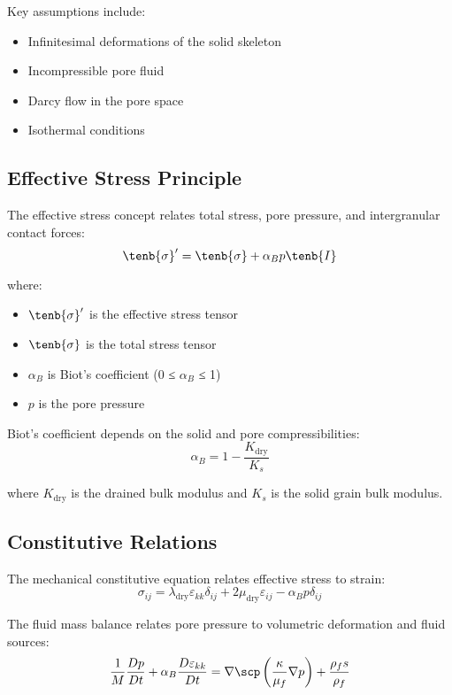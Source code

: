 Key assumptions include:
\begin{itemize}
\item Infinitesimal deformations of the solid skeleton
\item Incompressible pore fluid
\item Darcy flow in the pore space
\item Isothermal conditions
\end{itemize}

\subsection{Effective Stress Principle}

The effective stress concept relates total stress, pore pressure, and intergranular contact forces:
\begin{equation}
\tenb{\sigma}' = \tenb{\sigma} + \alpha_B p \tenb{I}
\end{equation}

where:
\begin{itemize}
\item $\tenb{\sigma}'$ is the effective stress tensor
\item $\tenb{\sigma}$ is the total stress tensor
\item $\alpha_B$ is Biot's coefficient (0 ≤ $\alpha_B$ ≤ 1)
\item $p$ is the pore pressure
\end{itemize}

Biot's coefficient depends on the solid and pore compressibilities:
\begin{equation}
\alpha_B = 1 - \frac{K_{\text{dry}}}{K_s}
\end{equation}

where $K_{\text{dry}}$ is the drained bulk modulus and $K_s$ is the solid grain bulk modulus.

\subsection{Constitutive Relations}

The mechanical constitutive equation relates effective stress to strain:
\begin{equation}
\sigma_{ij} = \lambda_{\text{dry}} \varepsilon_{kk} \delta_{ij} + 2\mu_{\text{dry}} \varepsilon_{ij} - \alpha_B p \delta_{ij}
\end{equation}

The fluid mass balance relates pore pressure to volumetric deformation and fluid sources:
\begin{equation}
\frac{1}{M}\frac{Dp}{Dt} + \alpha_B \frac{D\varepsilon_{kk}}{Dt} = \nabla \scp \left(\frac{\kappa}{\mu_f}\nabla p\right) + \frac{\rho_f s}{\rho_f}
\end{equation}

